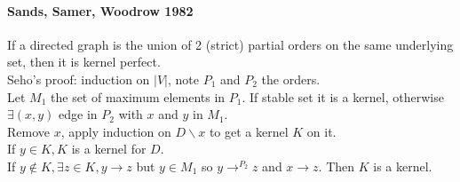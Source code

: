 \documentclass[12pt]{article}
\begin{document}
\paragraph{Sands, Samer, Woodrow 1982\\}
If a directed graph is the union of 2 (strict) partial orders on the same underlying set, then it is kernel perfect.\\
Seho's proof: induction on $|V|$, note $P_1$ and $P_2$ the orders.\\
Let $M_1$ the set of maximum elements in $P_1$. If stable set it is a kernel, otherwise $\exists (x,y)$ edge in $P_2$ with $x$ and $y$ in $M_1$.\\
Remove $x$, apply induction on $D \backslash x$ to get a kernel $K$ on it.\\
If $y \in K, K$ is a kernel for $D$.\\
If $y \notin K, \exists z \in K, y \rightarrow z$ but $y \in M_1$ so $y \rightarrow^{P_2} z$ and $x \rightarrow z$. Then $K$ is a kernel.
\end{document}
